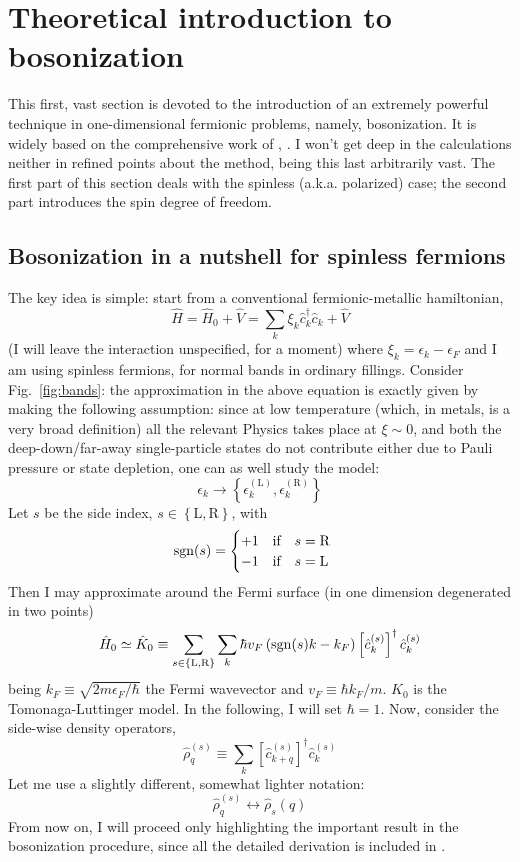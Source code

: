 \section{Theoretical introduction to bosonization}

This first, vast section is devoted to the introduction of an extremely powerful technique in one-dimensional fermionic problems, namely, bosonization. It is widely based on the comprehensive work of \citeauthor{giamarchi2003quantum}, \cite{giamarchi2003quantum}. I won't get deep in the calculations neither in refined points about the method, being this last arbitrarily vast. The first part of this section deals with the spinless (a.k.a. polarized) case; the second part introduces the spin degree of freedom.

\subsection{Bosonization in a nutshell for spinless fermions}

The key idea is simple: start from a conventional fermionic-metallic hamiltonian,
\[
	\hat H = \hat H_0 + \hat V = \sum_k \xi_k \hat c_k^\dagger \hat c_k + \hat V
\]
(I will leave the interaction unspecified, for a moment) where $\xi_k = \epsilon_k - \epsilon_F$ and I am using spinless fermions, for normal bands in ordinary fillings.
Consider Fig.~\ref{fig:bands}: the approximation in the above equation is exactly given by making the following assumption: since at low temperature (which, in metals, is a very broad definition) all the relevant Physics takes place at $\xi \sim 0$, and both the deep-down/far-away single-particle states do not contribute either due to Pauli pressure or state depletion, one can as well study the model:
\[
	\epsilon_k \to \left\{\epsilon_k^{(\mathrm L)}, \epsilon_k^{(\mathrm R)} \right\}
\]
Let $s$ be the side index, $s \in \left\{\mathrm L, \mathrm R\right\}$, with
\[
\mathrm{sgn}(s) = \begin{cases}
	+1 \quad \text{if} \quad s = \mathrm R \\
	-1 \quad \text{if} \quad s = \mathrm L
\end{cases}
\]
Then I may approximate around the Fermi surface (in one dimension degenerated in two points)
\[
	\hat H_0 \simeq \hat K_0 \equiv \sum_{s \in \left\{\mathrm L, \mathrm R\right\}} \sum_k \hbar v_F \left( \mathrm{sgn}(s) k -  k_F \right) \left[ \hat c_k^{(s)} \right]^\dagger \hat c_k^{(s)}
\]
being $k_F \equiv \sqrt{2m\epsilon_F/\hbar}$ the Fermi wavevector and $v_F \equiv \hbar k_F / m$. $\hat K_0$ is the Tomonaga-Luttinger model. In the following, I will set $\hbar=1$. Now, consider the side-wise density operators,
\[
	\hat \rho_q^{(s)} \equiv \sum_k  \left[ \hat c_{k+q}^{(s)} \right]^\dagger \hat c_k^{(s)}
\]
Let me use a slightly different, somewhat lighter notation:
\[
	\hat \rho_q^{(s)} \leftrightarrow \hat \rho_s (q)
\]
From now on, I will proceed only highlighting the important result in the bosonization procedure, since all the detailed derivation is included in \cite{giamarchi2003quantum}.

